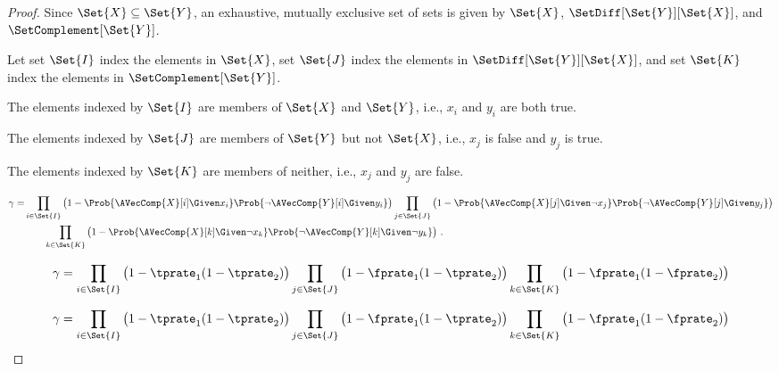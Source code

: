 \documentclass[ ../main.tex]{subfiles}
\begin{document}
\begin{proof}
	Since $\Set{X} \subseteq \Set{Y}$, an exhaustive, mutually exclusive set of 
	sets is given by $\Set{X}$, $\SetDiff[\Set{Y}][\Set{X}]$, and 
	$\SetComplement[\Set{Y}]$.
	
	Let set $\Set{I}$ index the elements in $\Set{X}$, set $\Set{J}$ index 
	the elements in $\SetDiff[\Set{Y}][\Set{X}]$, and set $\Set{K}$ index the 
	elements in $\SetComplement[\Set{Y}]$.
	
	The elements indexed by $\Set{I}$ are members of $\Set{X}$ and $\Set{Y}$, i.e.,
	$x_i$ and $y_i$ are both true.
	
	The elements indexed by $\Set{J}$ are members of $\Set{Y}$ but not $\Set{X}$,
	i.e., $x_j$ is false and $y_j$ is true.
	
	The elements indexed by $\Set{K}$ are members of neither, i.e., $x_j$ and $y_j$
	are false.
	
	
	\begin{equation}
	\begin{split}
	\gamma =
	&\prod_{i \in \Set{I}}
	\left(1-\Prob{\AVecComp{X}[i] \Given x_i}
	\Prob{\neg \AVecComp{Y}[i] \Given y_i}\right)
	\prod_{j \in \Set{J}}
	\left(1-\Prob{\AVecComp{X}[j] \Given \neg x_j}
	\Prob{\neg \AVecComp{Y}[j] \Given y_j}\right)\\
	&\qquad \prod_{k \in \Set{K}}
	\left(1-\Prob{\AVecComp{X}[k] \Given \neg x_k}
	\Prob{\neg \AVecComp{Y}[k] \Given \neg y_k}\right)\,.  
	\end{split}    
	\end{equation}
	
	
	
	\begin{equation}
	\gamma =
	\prod_{i \in \Set{I}}
	\left(1 - \tprate_1
	(1 - \tprate_2)\right)
	\prod_{j \in \Set{J}}
	\left(1 - \fprate_1
	(1 - \tprate_2)\right)
	\prod_{k \in \Set{K}}
	\left(1 - \fprate_1
	(1 - \fprate_2)\right)
	\end{equation}
	
	
	
	\begin{equation}
	\gamma =
	\prod_{i \in \Set{I}}
	\left(1 - \tprate_1
	(1 - \tprate_2)\right)
	\prod_{j \in \Set{J}}
	\left(1 - \fprate_1
	(1 - \tprate_2)\right)
	\prod_{k \in \Set{K}}
	\left(1 - \fprate_1
	(1 - \fprate_2)\right)
	\end{equation}
	
	
	

\end{proof}
\end{document}
